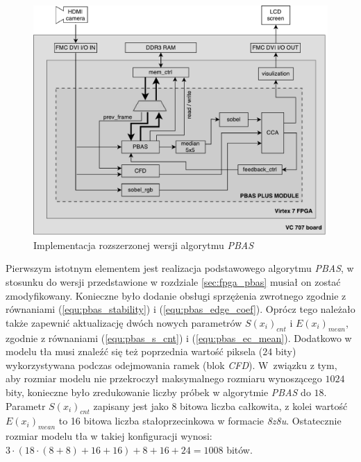	\begin{figure}[h!]
		\centering
		\includegraphics[scale=0.6]{img/4/pbas_plus.pdf}
		\caption{Implementacja rozszerzonej wersji algorytmu \textit{PBAS}}
		\label{fig:pbas_plus_diagram}
	\end{figure}
	
Pierwszym istotnym elementem jest realizacja podstawowego algorytmu \textit{PBAS}, w stosunku do wersji przedstawione w rozdziale \ref{sec:fpga_pbas} musiał on zostać zmodyfikowany. 
Konieczne było dodanie obsługi sprzężenia zwrotnego zgodnie z równaniami (\ref{equ:pbas_stability}) i (\ref{equ:pbas_edge_coef}). 
Oprócz tego należało także zapewnić aktualizację dwóch nowych parametrów $S(x_i)_{cnt}$ i $E(x_i)_{mean}$, zgodnie z równaniami (\ref{equ:pbas_s_cnt}) i (\ref{equ:pbas_ec_mean}). 
Dodatkowo w modelu tła musi znaleźć się też poprzednia wartość piksela ($24$ bity) wykorzystywana podczas odejmowania ramek (blok \textit{CFD}). 
W~związku z tym, aby rozmiar modelu nie przekroczył maksymalnego rozmiaru wynoszącego $1024$ bity, konieczne było zredukowanie liczby próbek w algorytmie \textit{PBAS} do $18$. 
Parametr $S(x_i)_{cnt}$ zapisany jest jako 8 bitowa liczba całkowita, z kolei wartość $E(x_i)_{mean}$ to 16 bitowa liczba stałoprzecinkowa w formacie \textit{8z8u}. 
Ostatecznie rozmiar modelu tła w takiej konfiguracji wynosi: $3 \cdot (18 \cdot (8+8) + 16 + 16) + 8 + 16 + 24 = 1008$ bitów.

